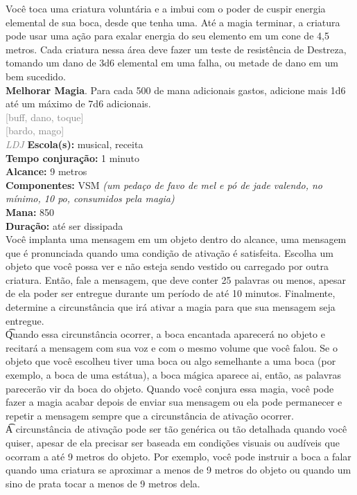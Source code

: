 \documentclass{RPG_Adventure}[2021/10/20]
\begin{document}
{\normalsize Você toca uma criatura voluntária e a imbui com o poder de cuspir energia elemental de sua boca, desde que tenha uma. Até a magia terminar, a criatura pode usar uma ação para exalar energia do seu elemento em um cone de 4,5 metros. Cada criatura nessa área deve fazer um teste de resistência de Destreza, tomando um dano de 3d6 elemental em uma falha, ou metade de dano em um bem sucedido.\\\t \textbf{Melhorar Magia}. Para cada 500 de mana adicionais gastos, adicione mais 1d6 até um máximo de 7d6 adicionais.\\}
{\scriptsize \textcolor{gray}{[buff, dano, toque]\\}}
{\scriptsize \textcolor{gray}{[bardo, mago]\\}}
{\tiny \textcolor{gray}{\textit{LDJ}}}
{\small \t \textbf{Escola(s):} musical, receita\\\t \textbf{Tempo conjuração:} 1 minuto\\\t \textbf{Alcance:} 9 metros\\\t \textbf{Componentes:} VSM \textit{(um pedaço de favo de mel e pó de jade valendo, no mínimo, 10 po, consumidos pela magia)}\\\t \textbf{Mana:} 850\\\t \textbf{Duração:} até ser dissipada\\}
{\normalsize Você implanta uma mensagem em um objeto dentro do alcance, uma mensagem que é pronunciada quando uma condição de ativação é satisfeita. Escolha um objeto que você possa ver e não esteja sendo vestido ou carregado por outra criatura. Então, fale a mensagem, que deve conter 25 palavras ou menos, apesar de ela poder ser entregue durante um período de até 10 minutos. Finalmente, determine a circunstância que irá ativar a magia para que sua mensagem seja entregue.\\\t Quando essa circunstância ocorrer, a boca encantada aparecerá no objeto e recitará a mensagem com sua voz e com o mesmo volume que você falou. Se o objeto que você escolheu tiver uma boca ou algo semelhante a uma boca (por exemplo, a boca de uma estátua), a boca mágica aparece ai, então, as palavras parecerão vir da boca do objeto. Quando você conjura essa magia, você pode fazer a magia acabar depois de enviar sua mensagem ou ela pode permanecer e repetir a mensagem sempre que a circunstância de ativação ocorrer.\\\t A circunstância de ativação pode ser tão genérica ou tão detalhada quando você quiser, apesar de ela precisar ser baseada em condições visuais ou audíveis que ocorram a até 9 metros do objeto. Por exemplo, você pode instruir a boca a falar quando uma criatura se aproximar a menos de 9 metros do objeto ou quando um sino de prata tocar a menos de 9 metros dela.\\}
\end{document}
